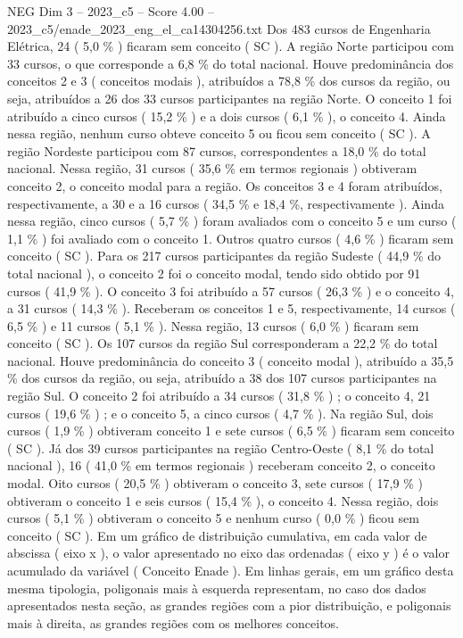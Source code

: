 \begin{textsample}{NEG Dim 3 – 2023\_c5 – Score 4.00 – 2023\_c5/enade\_2023\_eng\_el\_ca14304256.txt}
Dos 483 cursos de Engenharia Elétrica, 24 ( 5,0 \% ) ficaram sem conceito ( SC ).
A região Norte participou com 33 cursos, o que corresponde a 6,8 \% do total nacional.
Houve predominância dos conceitos 2 e 3 ( conceitos modais ), atribuídos a 78,8 \% dos cursos da região, ou seja, atribuídos a 26 dos 33 cursos participantes na região Norte.
O conceito 1 foi atribuído a cinco cursos ( 15,2 \% ) e a dois cursos ( 6,1 \% ), o conceito 4.
Ainda nessa região, nenhum curso obteve conceito 5 ou ficou sem conceito ( SC ).
A região Nordeste participou com 87 cursos, correspondentes a 18,0 \% do total nacional.
Nessa região, 31 cursos ( 35,6 \% em termos regionais ) obtiveram conceito 2, o conceito modal para a região.
Os conceitos 3 e 4 foram atribuídos, respectivamente, a 30 e a 16 cursos ( 34,5 \% e 18,4 \%, respectivamente ).
Ainda nessa região, cinco cursos ( 5,7 \% ) foram avaliados com o conceito 5 e um curso ( 1,1 \% ) foi avaliado com o conceito 1.
Outros quatro cursos ( 4,6 \% ) ficaram sem conceito ( SC ).
Para os 217 cursos participantes da região Sudeste ( 44,9 \% do total nacional ), o conceito 2 foi o conceito modal, tendo sido obtido por 91 cursos ( 41,9 \% ).
O conceito 3 foi atribuído a 57 cursos ( 26,3 \% ) e o conceito 4, a 31 cursos ( 14,3 \% ).
Receberam os conceitos 1 e 5, respectivamente, 14 cursos ( 6,5 \% ) e 11 cursos ( 5,1 \% ).
Nessa região, 13 cursos ( 6,0 \% ) ficaram sem conceito ( SC ).
Os 107 cursos da região Sul corresponderam a 22,2 \% do total nacional.
Houve predominância do conceito 3 ( conceito modal ), atribuído a 35,5 \% dos cursos da região, ou seja, atribuído a 38 dos 107 cursos participantes na região Sul.
O conceito 2 foi atribuído a 34 cursos ( 31,8 \% ) ; o conceito 4, 21 cursos ( 19,6 \% ) ; e o conceito 5, a cinco cursos ( 4,7 \% ).
Na região Sul, dois cursos ( 1,9 \% ) obtiveram conceito 1 e sete cursos ( 6,5 \% ) ficaram sem conceito ( SC ).
Já dos 39 cursos participantes na região Centro-Oeste ( 8,1 \% do total nacional ), 16 ( 41,0 \% em termos regionais ) receberam conceito 2, o conceito modal.
Oito cursos ( 20,5 \% ) obtiveram o conceito 3, sete cursos ( 17,9 \% ) obtiveram o conceito 1 e seis cursos ( 15,4 \% ), o conceito 4.
Nessa região, dois cursos ( 5,1 \% ) obtiveram o conceito 5 e nenhum curso ( 0,0 \% ) ficou sem conceito ( SC ).
Em um gráfico de distribuição cumulativa, em cada valor de abscissa ( eixo x ), o valor apresentado no eixo das ordenadas ( eixo y ) é o valor acumulado da variável ( Conceito Enade ).
Em linhas gerais, em um gráfico desta mesma tipologia, poligonais mais à esquerda representam, no caso dos dados apresentados nesta seção, as grandes regiões com a pior distribuição, e poligonais mais à direita, as grandes regiões com os melhores conceitos.

\end{textsample}
